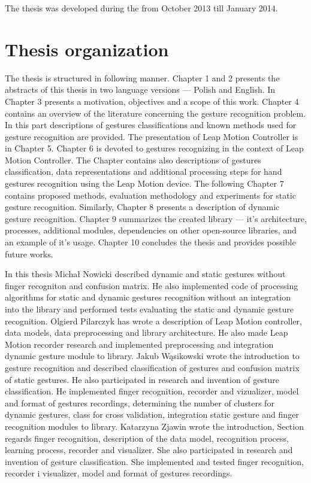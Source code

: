 The thesis was developed during the from October 2013 till January 2014.


\section{Thesis organization}
The thesis is structured in following manner. 
Chapter 1 and 2 presents the abstracts of this thesis in two language versions --- Polish and English. 
In Chapter 3 presents a motivation, objectives and a scope of this work. 
Chapter 4 contains an overview of the literature concerning the gesture recognition problem. 
In this part descriptions of gestures classifications and known methods used for gesture recognition are provided. 
The presentation of Leap Motion Controller is in Chapter 5.
Chapter 6 is devoted to gestures recognizing in the context of Leap Motion Controller.
The Chapter contains also descriptions of gestures classification, data representations and additional processing steps for hand gestures recognition using the Leap Motion device. 
The following Chapter 7 contains proposed methods, evaluation methodology and experiments for static gesture recognition. 
Similarly, Chapter 8 presents a description of dynamic gesture recognition. 
Chapter 9 summarizes the created library --- it's architecture, processes, additional modules, dependencies on other open-source libraries, and an example of it's usage. 
Chapter 10 concludes the thesis and provides possible future works. 


In this thesis Michał Nowicki described dynamic and static gestures without finger recogniton and confusion matrix. He also implemented code of processing algorithms for static and dynamic gestures recognition without an integration into the library and performed tests evaluating the static and dynamic gesture recognition. Olgierd Pilarczyk has wrote a description of Leap Motion controller, data models, data preprocessing and library architecture. He also made Leap Motion recorder research and implemented preprocessing and integration dynamic gesture module to library. Jakub Wąsikowski wrote the introduction to gesture recognition and described classification of gestures and confusion matrix of static gestures. He also participated in research and invention of gesture classification. He implemented finger recognition, recorder and vizualizer, model and format of gestures recordings, determining the number of clusters for dynamic gestures, class for cross validation, integration static gesture and finger recognition modules to library. Katarzyna Zjawin wrote the introduction, Section regards finger recognition, description of the data model, recognition process, learning process, recorder and visualizer. She also participated in research and invention of gesture classification. She implemented and tested finger recognition, recorder i visualizer, model and format of gestures recordings.


